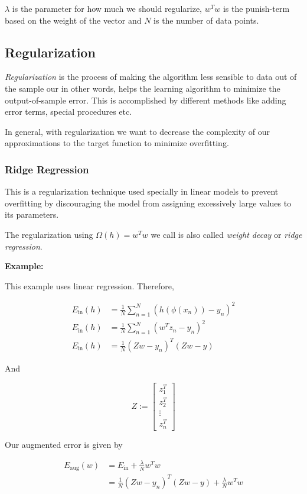 \(\lambda\) is the parameter for how much we should regularize, \(w^T w\) is the punish-term based on the weight of the vector and 
\(N\) is the number of data points.

\subsection{Regularization}

\emph{Regularization} is the process of making the algorithm less sensible to data out of the sample our in other words,
helps the learning algorithm to minimize the output-of-sample error. This is accomplished by different methods like adding error terms, 
special procedures etc.

In general, with regularization we want to decrease the complexity of our approximations to the target function to minimize overfitting.

\subsubsection{Ridge Regression}

This is a regularization technique used  specially in linear models to prevent overfitting by discouraging the model from assigning 
excessively large values to its parameters.

The regularization using \(\Omega(h) = w^T w\) we call is also called \emph{weight decay} or \emph{ridge regression}.

\textbf{Example:}

This example uses linear regression. Therefore, 

\begin{align*}
    E_{\text{in}}(h) &= \frac{1}{N} \sum_{n = 1}^{N}(h(\phi(x_n)) - y_n)^2 \\
    E_{\text{in}}(h) &= \frac{1}{N} \sum_{n = 1}^{N}(w^Tz_n - y_n)^2 \\
    E_{\text{in}}(h) &= \frac{1}{N} (Zw - y_n)^T(Zw - y)
\end{align*}

And 

\[
    Z := \begin{bmatrix}
        z_1^T \\ z_2^T \\ \vdots \\ z_{n}^T 
    \end{bmatrix}
\]

Our augmented error is given by 

\begin{align*} 
    E_{\text{aug}} (w) &= E_{\text{in}} + \frac{\lambda}{N} w^T w \\ 
    &= \frac{1}{N} (Zw - y_n)^T(Zw - y) + \frac{\lambda}{N} w^T w 
\end{align*}

